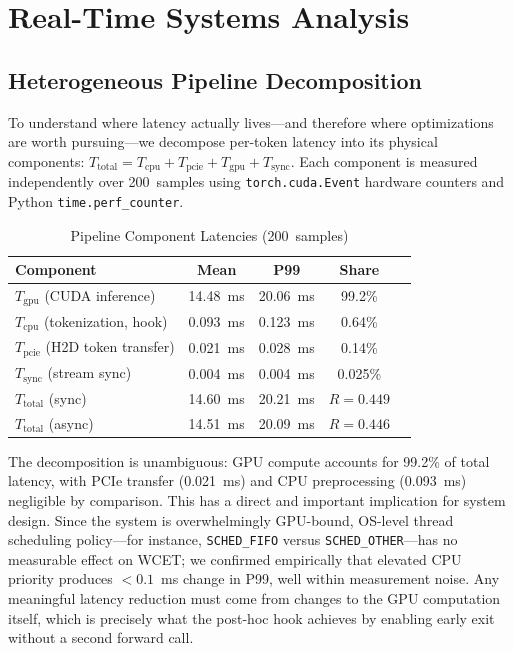 \documentclass[conference]{IEEEtran}
\begin{document}
\section{Real-Time Systems Analysis}

\subsection{Heterogeneous Pipeline Decomposition}
\label{sec:pipeline}

To understand where latency actually lives---and therefore where
optimizations are worth pursuing---we decompose per-token latency into
its physical components:
$T_{\text{total}} = T_{\text{cpu}} + T_{\text{pcie}} +
T_{\text{gpu}} + T_{\text{sync}}$.
Each component is measured independently over 200~samples using
\texttt{torch.cuda.Event} hardware counters and Python \texttt{time.perf\_counter}.

\begin{table}[htbp]
\caption{Pipeline Component Latencies (200~samples)}
\centering
\setlength{\tabcolsep}{4pt}
\begin{tabular}{@{}lcccc@{}}
\toprule
\textbf{Component} & \textbf{Mean} & \textbf{P99} & \textbf{Share} \\
\midrule
$T_{\text{gpu}}$  (CUDA inference)       & 14.48~ms & 20.06~ms & 99.2\% \\
$T_{\text{cpu}}$  (tokenization, hook)   & 0.093~ms & 0.123~ms &  0.64\% \\
$T_{\text{pcie}}$ (H2D token transfer)   & 0.021~ms & 0.028~ms &  0.14\% \\
$T_{\text{sync}}$ (stream sync)          & 0.004~ms & 0.004~ms &  0.025\% \\
\midrule
$T_{\text{total}}$ (sync)  & 14.60~ms & 20.21~ms & $R=0.449$ \\
$T_{\text{total}}$ (async) & 14.51~ms & 20.09~ms & $R=0.446$ \\
\bottomrule
\end{tabular}
\label{tab:pipeline}
\end{table}

The decomposition is unambiguous: GPU compute accounts for 99.2\% of
total latency, with PCIe transfer (0.021~ms) and CPU preprocessing
(0.093~ms) negligible by comparison.
This has a direct and important implication for system design.
Since the system is overwhelmingly GPU-bound, OS-level thread scheduling
policy---for instance, \texttt{SCHED\_FIFO} versus \texttt{SCHED\_OTHER}---has
no measurable effect on WCET; we confirmed empirically that elevated
CPU priority produces $<0.1$~ms change in P99, well within measurement
noise.
Any meaningful latency reduction must come from changes to the GPU
computation itself, which is precisely what the post-hoc hook achieves
by enabling early exit without a second forward call.
\end{document}
